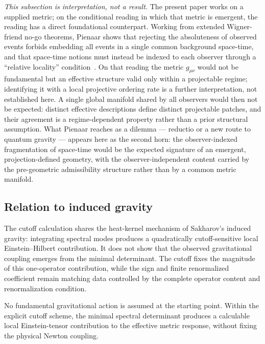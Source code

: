 \documentclass[pdflatex,sn-mathphys-num]{sn-jnl} %
\theoremstyle{remark}
\theoremstyle{plain}
\begin{document}
    \emph{This subsection is interpretation, not a result.}
    The present paper works on a supplied metric; on the conditional reading in which that metric is emergent, the
    reading has a direct foundational counterpart.
    Working from extended Wigner-friend no-go theorems, Pienaar shows that rejecting the absoluteness of
    observed events forbids embedding all events in a single common background space-time, and that
    space-time notions must instead be indexed to each observer through a ``relative locality''
    condition~\cite{Pienaar2026}.
    On that reading the metric $g_{\mu\nu}$ would not be fundamental but an effective structure valid only within a
    projectable regime; identifying it with a local projective ordering rate is a further interpretation, not
    established here.
    A single global manifold shared by all observers would then not be expected: distinct effective
    descriptions define distinct projectable patches, and their agreement is a regime-dependent property
    rather than a prior structural assumption.
    What Pienaar reaches as a dilemma --- reductio or a new route to quantum gravity --- appears here as
    the second horn: the observer-indexed fragmentation of space-time would be the expected signature of an
    emergent, projection-defined geometry, with the observer-independent content carried by the
    pre-geometric admissibility structure rather than by a common metric manifold.

  \subsection{Relation to induced gravity}
    \label{subsec:induced-gravity}

    The cutoff calculation shares the heat-kernel mechanism of Sakharov's induced gravity:
    integrating spectral modes produces a quadratically cutoff-sensitive local Einstein--Hilbert contribution.
    It does not show that the observed gravitational coupling emerges from the minimal determinant.
    The cutoff fixes the magnitude of this one-operator contribution, while the sign and finite renormalized coefficient
    remain matching data controlled by the complete operator content and renormalization condition.

    No fundamental gravitational action is assumed at the starting point.
    Within the explicit cutoff scheme, the minimal spectral determinant produces a calculable local
    Einstein-tensor contribution to the effective metric response, without fixing the physical Newton coupling.
\end{document}
